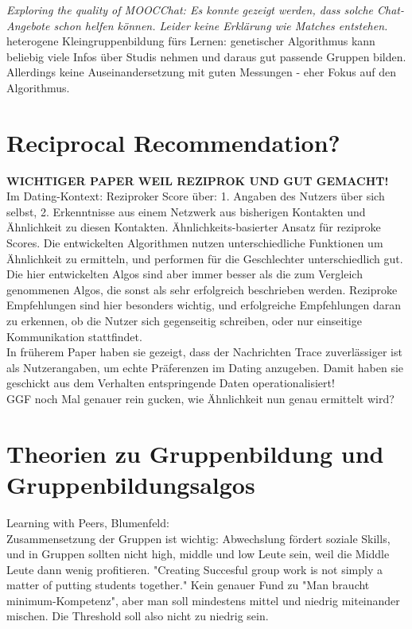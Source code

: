 \documentclass[nochapterpage,bigchapter,linedtoc,longdoc,colorback,accentcolor=tud3b]{tudreport}
\begin{document}
\textit{Exploring the quality of MOOCChat: Es konnte gezeigt werden, dass solche Chat-Angebote schon helfen können. Leider keine Erklärung wie Matches entstehen. \cite{reidsema2016exploring}}\\

heterogene Kleingruppenbildung fürs Lernen: genetischer Algorithmus kann beliebig viele Infos über Studis nehmen und daraus gut passende Gruppen bilden. Allerdings keine Auseinandersetzung mit guten Messungen - eher Fokus auf den Algorithmus. \cite{moreno2012genetic}\\

\section{Reciprocal Recommendation?}

\textbf{WICHTIGER PAPER WEIL REZIPROK UND GUT GEMACHT!}\\
Im Dating-Kontext: Reziproker Score über: 1. Angaben des Nutzers über sich selbst, 2. Erkenntnisse aus einem Netzwerk aus bisherigen Kontakten und Ähnlichkeit zu diesen Kontakten. Ähnlichkeits-basierter Ansatz für reziproke Scores. Die entwickelten Algorithmen nutzen unterschiedliche Funktionen um Ähnlichkeit zu ermitteln, und performen für die Geschlechter unterschiedlich gut. Die hier entwickelten Algos sind aber immer besser als die zum Vergleich genommenen Algos, die sonst als sehr erfolgreich beschrieben werden. Reziproke Empfehlungen sind hier besonders wichtig, und erfolgreiche Empfehlungen daran zu erkennen, ob die Nutzer sich gegenseitig schreiben, oder nur einseitige Kommunikation stattfindet. \cite{xia2015reciprocal} \\
In früherem Paper haben sie gezeigt, dass der Nachrichten Trace zuverlässiger ist als Nutzerangaben, um echte Präferenzen im Dating anzugeben. Damit haben sie geschickt aus dem Verhalten entspringende Daten operationalisiert! \cite{xia2014characterization}\\
GGF noch Mal genauer rein gucken, wie Ähnlichkeit nun genau ermittelt wird?\\

\section{Theorien zu Gruppenbildung und Gruppenbildungsalgos}
Learning with Peers, Blumenfeld: \cite{blumenfeld1996learning}\\
Zusammensetzung der Gruppen ist wichtig: Abwechslung fördert soziale Skills, und in Gruppen sollten nicht high, middle und low Leute sein, weil die Middle Leute dann wenig profitieren. "Creating Succesful group work is not simply a matter of putting students together." Kein genauer Fund zu "Man braucht minimum-Kompetenz", aber man soll mindestens mittel und niedrig miteinander mischen. Die Threshold soll also nicht zu niedrig sein.\\
\end{document}
